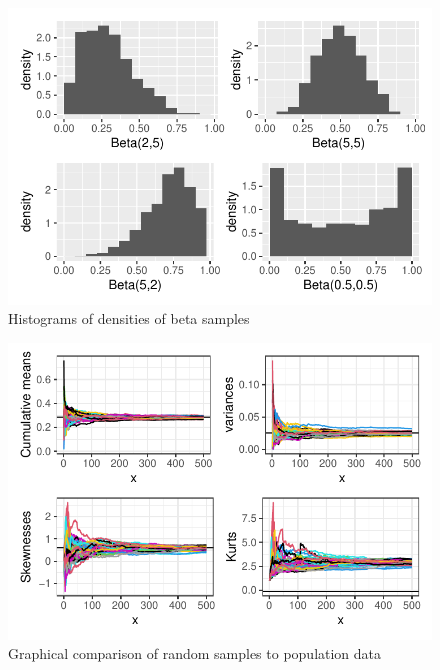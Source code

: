 \documentclass{article}\usepackage[]{graphicx}\usepackage[]{xcolor}
\makeatletter
\def\maxwidth{ %
  \ifdim\Gin@nat@width>\linewidth
    \linewidth
  \else
    \Gin@nat@width
  \fi
}
\newenvironment{knitrout}{}{} %
\makeatother
\begin{document}
\begin{multicols}{2}
\begin{figure}[H]
\begin{center}
\begin{knitrout}
\color{fgcolor}
\includegraphics[width=\maxwidth]{figure/unnamed-chunk-3-1} 
\end{knitrout}
\caption{Histograms of densities of beta samples}
\label{plot2} 
\end{center}
\end{figure}



\begin{figure}[H]
\begin{center}
\begin{knitrout}
\color{fgcolor}
\includegraphics[width=\maxwidth]{figure/unnamed-chunk-4-1} 
\end{knitrout}
\caption{Graphical comparison of random samples to population data}
\label{plot3} 
\end{center}
\end{figure}

\end{multicols}
\end{document}

